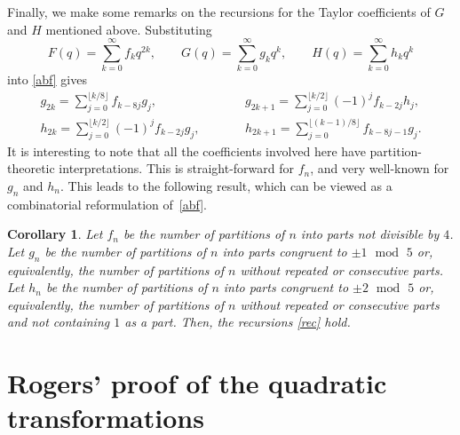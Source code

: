 \documentclass[11pt]{article}
\numberwithin{equation}{section}
\numberwithin{equation}{section}
\newtheorem{Corollary}[Theorem]{Corollary}
\begin{document}
Finally, we make some remarks on the
 recursions for the Taylor coefficients of $G$ and $H$ mentioned above.
Substituting
\begin{equation*}F(q)=\sum_{k=0}^\infty f_kq^{2k},\qquad G(q)=\sum_{k=0}^\infty g_kq^k,\qquad H(q)=\sum_{k=0}^\infty h_kq^k\end{equation*}
into \eqref{abf} gives
\begin{subequations}\label{rec}
\begin{alignat}{3}%
& g_{2k}=\sum_{j=0}^{\lfloor k/8\rfloor}f_{k-8j}g_j,\qquad&&
g_{2k+1}=\sum_{j=0}^{\lfloor k/2\rfloor}(-1)^jf_{k-2j}h_j,&\\
& h_{2k}=\sum_{j=0}^{\lfloor k/2\rfloor}(-1)^jf_{k-2j}g_j,\qquad&&
h_{2k+1}=\sum_{j=0}^{\lfloor (k-1)/8\rfloor}f_{k-8j-1}g_j.&
\end{alignat}
\end{subequations}
It is interesting to note that all the coefficients involved here have partition-theoretic interpretations. This is straight-forward for $f_n$, and very well-known for $g_n$ and $h_n$.
This leads to the following result, which can be viewed as a combinatorial reformulation of~\eqref{abf}.

\begin{Corollary}
Let $f_n$ be the number of partitions of $n$ into parts not divisible by $4$.
Let $g_n$ be the number of partitions of $n$ into parts congruent to $\pm 1$ $\operatorname{mod}$ $5$ or, equivalently, the number of partitions
of $n$ without repeated or consecutive parts. Let $h_n$ be
the number of partitions of $n$ into parts congruent to $\pm 2$ $\operatorname{mod}$ $5$ or, equivalently, the number of partitions
of $n$ without repeated or consecutive parts and not containing $1$ as a part. Then, the recursions \eqref{rec} hold.
\end{Corollary}


\setcounter{section}{3}
\section{Rogers' proof of the quadratic transformations}\label{rpss}
\end{document}
